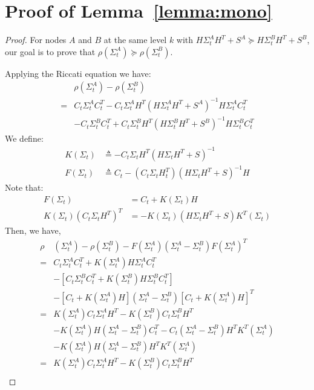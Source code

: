 \documentclass[journal]{IEEEtran}
\begin{document}
\section{Proof of Lemma~\ref{lemma:mono}}
\begin{proof}
For nodes $A$ and $B$ at the same level $k$ with $H\Sigma_{t}^AH^T+S^A \succeq H\Sigma_{t}^BH^T+ S^B$, our goal is to prove that $\rho(\Sigma_{t}^A)\succeq \rho(\Sigma_{t}^B)$.

Applying the Riccati equation we have:
\begin{equation}
\begin{split}
&\rho(\Sigma_{t}^A)- \rho(\Sigma_{t}^B)\\
=&C_t\Sigma_{t}^AC_t^T-C_t\Sigma_{t}^AH^T\left(H\Sigma_{t}^AH^T+S^A\right)^{-1}H\Sigma_{t}^AC_t^T\\
&-  C_t\Sigma_{t}^BC_t^T+C_t\Sigma_{t}^BH^T\left(H\Sigma_{t}^BH^T+ S^B\right)^{-1}H\Sigma_{t}^BC_t^T  
\end{split}
\end{equation}
We define:
\begin{align*}
K(\Sigma_t) &\triangleq -C_t\Sigma_t H^T(H\Sigma_t H^T+S)^{-1}\\
F(\Sigma_t) &\triangleq C_t-(C_t\Sigma_t H_t^T)(H\Sigma_t H^T+S)^{-1}H
\end{align*}
Note that:
\begin{align*}
F(\Sigma_t) &= C_t+K(\Sigma_t)H\\
K(\Sigma_t)(C_t\Sigma_t H^T)^T & =-K(\Sigma_t)(H\Sigma_t H^T+S)K^T(\Sigma_t)
\end{align*}
Then, we have,
\begin{equation}
\begin{split}
\rho&(\Sigma^A_{t})-\rho(\Sigma^B_{t})-F(\Sigma^A_{t})(\Sigma^A_{t}-\Sigma^B_{t})F(\Sigma^A_{t})^T\\
=&C_t\Sigma_t^AC_t^T + K(\Sigma_t^A)H\Sigma_t^AC_t^T \\
&- [C_t\Sigma_t^BC_t^T+ K(\Sigma_t^B)H\Sigma_t^BC_t^T]\\
&- [C_t+K(\Sigma_t^A)H](\Sigma_t^A-\Sigma_t^B)[C_t+K(\Sigma_t^A)H]^T\\
=&K(\Sigma^A_{t})C_t\Sigma^A_{t}H^T-K(\Sigma^B_{t})C_t\Sigma^B_{t}H^T\\
&-K(\Sigma^A_{t})H(\Sigma^A_{t}-\Sigma^B_{t})C_t^T-C_t(\Sigma^A_{t}-\Sigma^B_{t})H^TK^T(\Sigma^A_{t})\\
&-K(\Sigma^A_{t})H(\Sigma^A_{t}-\Sigma^B_{t})H^TK^T(\Sigma^A_{t})\\
=&K(\Sigma^A_{t})C_t\Sigma^A_{t}H^T-K(\Sigma^B_{t})C_t\Sigma^B_{t}H^T\\

\end{split}
\end{equation}
\end{proof}
\end{document}
